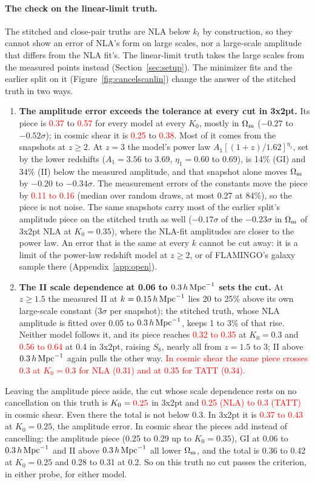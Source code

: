 \documentclass[11pt]{article}
\newcommand{\hMpc}{\,h\,{\rm Mpc}^{-1}}
\newcommand{\Om}{\Omega_{\rm m}}
\newif\ifnumbersfinal
\newcommand{\refresh}[1]{\ifnumbersfinal#1\else\textcolor{red}{#1}\fi}
\newcommand{\LLampTlo}{\refresh{0.37}}
\newcommand{\LLampThi}{\refresh{0.57}}
\newcommand{\LLampCSlo}{\refresh{0.25}}
\newcommand{\LLampCShi}{\refresh{0.38}}
\newcommand{\LLnoise}{\refresh{0.11 to 0.16}}
\newcommand{\LLIIthree}{\refresh{0.32 to 0.35}}
\newcommand{\LLIIfour}{\refresh{0.56 to 0.64}}
\newcommand{\LLcsShape}{\refresh{In cosmic shear the same piece crosses \Tol{} at $K_0 = 0.3$ for NLA (0.31) and at 0.35 for TATT (0.34).}}
\newcommand{\LLcutT}{\refresh{0.25}}
\newcommand{\LLcutCS}{\refresh{0.25 (NLA) to 0.3 (TATT)}}
\newcommand{\LLtotT}{\refresh{0.37 to 0.43}}
\newcommand{\Tol}{0.3}
\begin{document}
\paragraph{The check on the linear-limit truth.}
The stitched and close-pair truths are NLA below $k_t$ by construction, so
they cannot show an error of NLA's form on large scales, nor a large-scale
amplitude that differs from the NLA fit's. The linear-limit truth takes the
large scales from the measured points instead (Section~\ref{sec:setup}).
The minimizer fits and the earlier split on it
(Figure~\ref{fig:cancelscanlin}) change the answer of the stitched truth in
two ways.
\begin{enumerate}
  \item \textbf{The amplitude error exceeds the tolerance at every cut in
    3x2pt.} Its piece is \LLampTlo{} to \LLampThi{} for every model at every
    $K_0$, mostly in $\Om$ ($-0.27$ to $-0.52\sigma$); in cosmic shear it is
    \LLampCSlo{} to \LLampCShi. Most of it comes from the snapshots at $z \ge
    2$. At $z = 3$ the model's power law $A_1[(1+z)/1.62]^{\eta_1}$, set by
    the lower redshifts ($A_1 = 3.56$ to 3.69, $\eta_1 = 0.60$ to 0.69), is
    14\% (GI) and 34\% (II) below the measured amplitude, and that snapshot
    alone moves $\Om$ by $-0.20$ to $-0.34\sigma$. The measurement errors of
    the constants move the piece by \LLnoise{} (median over random draws, at
    most 0.27 at 84\%), so the piece is not noise. The same snapshots carry
    most of the earlier split's amplitude piece on the stitched truth as well ($-0.17\sigma$
    of the $-0.23\sigma$ in $\Om$ of 3x2pt NLA at $K_0 = 0.35$), where the
    NLA-fit amplitudes are closer to the power law. An error that is the same
    at every $k$ cannot be cut away: it is a limit of the power-law redshift
    model at $z \ge 2$, or of FLAMINGO's galaxy sample there
    (Appendix~\ref{app:open}).
  \item \textbf{The II scale dependence at 0.06 to $0.3\hMpc$ sets the cut.}
    At $z \ge 1.5$ the measured II at $k = 0.15\hMpc$ lies 20 to 25\% above
    its own large-scale constant (3$\sigma$ per snapshot); the stitched truth,
    whose NLA amplitude is fitted over 0.05 to $0.3\hMpc$, keeps 1 to 3\% of
    that rise. Neither model follows it, and its piece reaches \LLIIthree{} at
    $K_0 = 0.3$ and \LLIIfour{} at 0.4 in 3x2pt, raising $S_8$, nearly all
    from $z = 1.5$ to 3; II above $0.3\hMpc$ again pulls the other way.
    \LLcsShape
\end{enumerate}
Leaving the amplitude piece aside, the cut whose scale dependence rests on no
cancellation on this truth is $K_0 = \LLcutT$ in 3x2pt and \LLcutCS{} in
cosmic shear. Even there the total is not below \Tol. In 3x2pt it is \LLtotT{}
at $K_0 = 0.25$, the amplitude error. In cosmic shear the pieces add instead
of cancelling: the amplitude piece (0.25 to 0.29 up to $K_0 = 0.35$), GI at
0.06 to $0.3\hMpc$ and II above $0.3\hMpc$ all lower $\Om$, and the total is
0.36 to 0.42 at $K_0 = 0.25$ and 0.28 to 0.31 at 0.2. So on this truth no
cut passes the criterion, in either probe, for either model.
\end{document}
